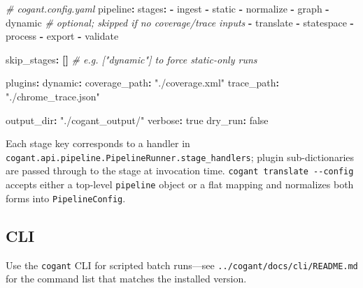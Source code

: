 \documentclass[
]{article}
\newenvironment{Shaded}{}{}
\newcommand{\AttributeTok}[1]{\textcolor[rgb]{0.49,0.56,0.16}{#1}}
\newcommand{\CharTok}[1]{\textcolor[rgb]{0.25,0.44,0.63}{#1}}
\newcommand{\CommentTok}[1]{\textcolor[rgb]{0.38,0.63,0.69}{\textit{#1}}}
\newcommand{\FunctionTok}[1]{\textcolor[rgb]{0.02,0.16,0.49}{#1}}
\newcommand{\KeywordTok}[1]{\textcolor[rgb]{0.00,0.44,0.13}{\textbf{#1}}}
\newcommand{\StringTok}[1]{\textcolor[rgb]{0.25,0.44,0.63}{#1}}
\begin{document}
\begin{Shaded}
\begin{Highlighting}[]
\CommentTok{\# cogant.config.yaml}
\FunctionTok{pipeline}\KeywordTok{:}
\AttributeTok{  }\FunctionTok{stages}\KeywordTok{:}
\AttributeTok{    }\KeywordTok{{-}}\AttributeTok{ ingest}
\AttributeTok{    }\KeywordTok{{-}}\AttributeTok{ static}
\AttributeTok{    }\KeywordTok{{-}}\AttributeTok{ normalize}
\AttributeTok{    }\KeywordTok{{-}}\AttributeTok{ graph}
\AttributeTok{    }\KeywordTok{{-}}\AttributeTok{ dynamic}\CommentTok{       \# optional; skipped if no coverage/trace inputs}
\AttributeTok{    }\KeywordTok{{-}}\AttributeTok{ translate}
\AttributeTok{    }\KeywordTok{{-}}\AttributeTok{ statespace}
\AttributeTok{    }\KeywordTok{{-}}\AttributeTok{ process}
\AttributeTok{    }\KeywordTok{{-}}\AttributeTok{ export}
\AttributeTok{    }\KeywordTok{{-}}\AttributeTok{ validate}

\AttributeTok{  }\FunctionTok{skip\_stages}\KeywordTok{:}\AttributeTok{ }\KeywordTok{[]}\CommentTok{   \# e.g. ["dynamic"] to force static{-}only runs}

\AttributeTok{  }\FunctionTok{plugins}\KeywordTok{:}
\AttributeTok{    }\FunctionTok{dynamic}\KeywordTok{:}
\AttributeTok{      }\FunctionTok{coverage\_path}\KeywordTok{:}\AttributeTok{ }\StringTok{"./coverage.xml"}
\AttributeTok{      }\FunctionTok{trace\_path}\KeywordTok{:}\AttributeTok{ }\StringTok{"./chrome\_trace.json"}

\AttributeTok{  }\FunctionTok{output\_dir}\KeywordTok{:}\AttributeTok{ }\StringTok{"./cogant\_output/"}
\AttributeTok{  }\FunctionTok{verbose}\KeywordTok{:}\AttributeTok{ }\CharTok{true}
\AttributeTok{  }\FunctionTok{dry\_run}\KeywordTok{:}\AttributeTok{ }\CharTok{false}
\end{Highlighting}
\end{Shaded}

Each stage key corresponds to a handler in
\texttt{cogant.api.pipeline.PipelineRunner.stage\_handlers}; plugin
sub-dictionaries are passed through to the stage at invocation time.
\texttt{cogant\ translate\ -\/-config} accepts either a top-level
\texttt{pipeline} object or a flat mapping and normalizes both forms
into \texttt{PipelineConfig}.

\subsection{CLI}\label{cli}

Use the \texttt{cogant} CLI for scripted batch runs---see
\texttt{../cogant/docs/cli/README.md} for the command list that matches
the installed version.
\end{document}
